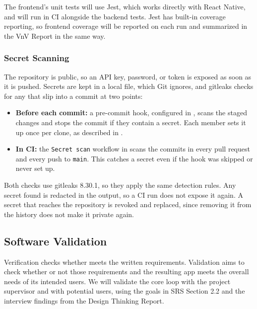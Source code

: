 \documentclass[12pt, titlepage]{article}
\begin{document}
The frontend's unit tests will use Jest, which works directly with React
Native, and will run in CI alongside the backend tests. Jest has built-in
coverage reporting, so frontend coverage will be reported on each run and
summarized in the VnV Report in the same way.

\subsubsection{Secret Scanning}

The repository is public, so an API key, password, or token is exposed as soon
as it is pushed. Secrets are kept in a local  file, which Git
ignores, and gitleaks checks for any that slip into a commit at two points:

\begin{itemize}
  \item \textbf{Before each commit:} a pre-commit hook, configured in
    , scans the staged changes and stops the
    commit if they contain a secret. Each member sets it up once per clone, as
    described in .
  \item \textbf{In CI:} the \texttt{Secret scan} workflow in
     scans the commits in every pull
    request and every push to \texttt{main}. This catches a secret even if the
    hook was skipped or never set up.
\end{itemize}

Both checks use gitleaks 8.30.1, so they apply the same detection rules. Any
secret found is redacted in the output, so a CI run does not expose it again.
A secret that reaches the repository is revoked and replaced, since removing
it from the history does not make it private again.

\subsection{Software Validation} \label{SecSoftwareValidation}

Verification checks whether \progname{} meets the written requirements. Validation aims to check whether or not those requirements and the resulting app meets the overall needs of its intended users. We will validate the core loop with the project supervisor and with potential users, using the goals in SRS Section 2.2 and the interview findings from the Design Thinking Report.
\end{document}
